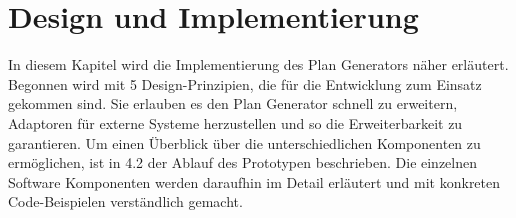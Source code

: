 \chapter{Design und Implementierung}

In diesem Kapitel wird die Implementierung des Plan Generators näher erläutert. Begonnen wird mit 5 Design-Prinzipien, die für die Entwicklung zum Einsatz gekommen sind. Sie erlauben es den Plan Generator schnell zu erweitern, Adaptoren für externe Systeme herzustellen und so die Erweiterbarkeit zu garantieren. Um einen Überblick über die unterschiedlichen Komponenten zu ermöglichen, ist in 4.2 der Ablauf des Prototypen beschrieben. Die einzelnen Software Komponenten werden daraufhin im Detail erläutert und mit konkreten Code-Beispielen verständlich gemacht.







%












%






